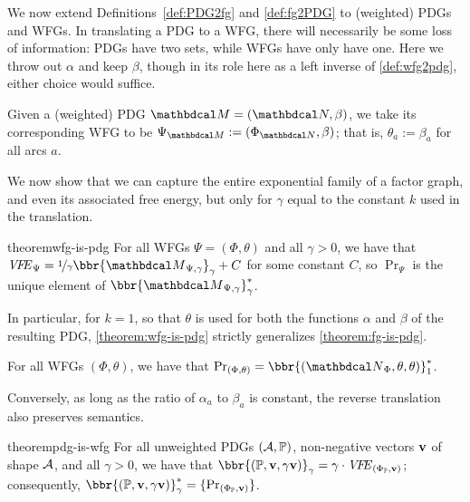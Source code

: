 We now extend Definitions~\ref{def:PDG2fg} and \ref{def:fg2PDG} to
(weighted) PDGs and WFGs.  
In translating a PDG to a WFG, 
there will necessarily be some loss of information: PDGs have two sets, while WFGs have 
only have one. Here we throw out $\alpha$ and keep $\beta$, 
though in its role here as a left inverse of \cref{def:wfg2pdg},
either choice would suffice. 


\begin{defn}
Given a (weighted) PDG $\dg M =
(\dg N, \beta)$, we take its corresponding WFG to be $\WFGof{\dg M} :=
(\FGof{\dg N}, \beta)$; that is, $\theta_a := \beta_a$ for all arcs $a$.
\end{defn}
We now show that we can capture the entire exponential family of a factor graph,
and even its associated free energy, 
but only for $\gamma$ equal to the constant $k$ used in
the translation.  


\begin{linked}{theorem}{wfg-is-pdg}
For all WFGs $\Psi = (\Phi,\theta)$ and all $\gamma > 0$,
we have that
$\VFE_\Psi
= \nicefrac1{\gamma} \bbr{{\dg M}_{\Psi,\gamma}}_{\gamma} 
+ C$   
for some constant $C$, so
$\Pr_{\Psi}$ is the unique element of
$\bbr{{\dg M}_{\Psi,\gamma}}_{\gamma}^*$.
\end{linked}

In particular, for $k\!=\!1$, so that $\theta$ is used for both the functions
$\alpha$ and $\beta$ of the resulting PDG,
\cref{theorem:wfg-is-pdg} strictly generalizes \cref{theorem:fg-is-pdg}.
\begin{coro}
	For all WFGs $(\Phi, \theta)$,
	we have that
	$\Pr_{(\Phi,\theta)} = \bbr{(\UPDGof{\Phi}, \theta,\theta)}_1^*$.
\end{coro}

Conversely, as long as the ratio of $\alpha_a$ to $\beta_a$ is constant, the
reverse translation also preserves semantics.

\begin{linked}{theorem}{pdg-is-wfg}
For all unweighted PDGs $(\mathcal A, \mathbb P)$, non-negative vectors $\mathbf v$
of shape $\mathcal A$, and all $\gamma > 0$, we have that 
$\bbr{(\mathbb P, \mat v, \gamma \mat v)}_{\gamma}
= \gamma\cdot\VFE_{(\Phi_{\mathbb P}, \mat v)} $; consequently,
$\bbr{(\mathbb P,  \mat v,  \gamma\mat v)}_{\gamma}^*
		= \{\Pr_{(\Phi_{\mathbb P}, \mat v)} \}$. 
\end{linked}




